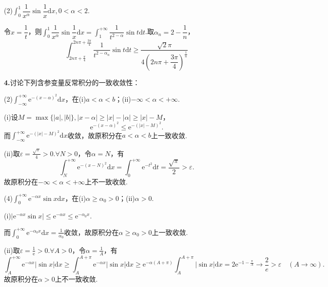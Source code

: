 \documentclass[12pt, a4paper]{article}
\newcommand{\e}{\mathrm{e}}
\newcommand{\dif}{\mathrm{d}}
\begin{document}
(2)\(\int_0^1 \dfrac{1}{x^\alpha}\sin\dfrac{1}{x}\dif x, 0 < \alpha < 2\).

令\(x = \dfrac{1}{t}\)，则\(\int_0^1 \dfrac{1}{x^\alpha}\sin\dfrac{1}{x}\dif x = \int_{1}^{+\infty} \dfrac{1}{t^{2 - \alpha}}\sin t\dif t\).取\(\alpha_n = 2 - \dfrac{1}{n}\)，
\[\int_{2n\pi + \frac{\pi}{4}}^{2n\pi + \frac{3\pi}{4}} \frac{1}{t^{2 - \alpha_n}}\sin t\dif t \geq \frac{\sqrt{2}\pi}{4\left(2n\pi + \dfrac{3\pi}{4}\right)^{\frac{1}{n}}}\]

\textbf{4.}讨论下列含参变量反常积分的一致收敛性：

(2)\(\int_{-\infty}^{+\infty} \e^{-(x - \alpha)^2}\dif x\)，在(i)\(a < \alpha < b\)；(ii)\(-\infty < \alpha < +\infty\).

(i)设\(M = \max\{|a|, |b|\}, |x - \alpha| \geq |x| - |\alpha| \geq |x| - M\)，
\[\e^{-(x - \alpha)^2} \leq \e^{-(|x| - M)^2}.\]
而\(\int_{-\infty}^{+\infty} \e^{-(|x| - M)^2}\dif x\)收敛，故原积分在\(a < \alpha < b\)上一致收敛.

(ii)取\(\varepsilon = \frac{\sqrt{\pi}}{4} > 0. \forall N > 0\)，令\(\alpha = N\)，有
\[\int_{N}^{+\infty} \e^{-(x - N)^2}\dif x = \int_{0}^{+\infty} \e^{-t^2}\dif t = \frac{\sqrt{\pi}}{2} > \varepsilon.\]
故原积分在\(-\infty < \alpha < +\infty\)上不一致收敛.

(4)\(\int_{0}^{+\infty}\e^{-\alpha x}\sin x\dif x\)，在(i)\(\alpha \geq \alpha_0 > 0\)；(ii)\(\alpha > 0\).

(i)\(|\e^{-\alpha x}\sin x| \leq \e^{-\alpha x} \leq \e^{-\alpha_0 x}\).

而\(\int_{0}^{+\infty}\e^{-\alpha_0 x}\dif x = \frac{1}{\alpha_0}\)收敛，故原积分在\(\alpha \geq \alpha_0 > 0\)上一致收敛.

(ii)取\(\varepsilon = \frac{1}{\e} > 0. \forall A > 0\)，令\(\alpha = \frac{1}{A}\)，有
\[\int_{A}^{+\infty}\e^{-\alpha x}|\sin x|\dif x \geq \int_{A}^{A + \pi}\e^{-\alpha x}|\sin x|\dif x \geq \e^{-\alpha(A + \pi)}\int_{A}^{A + \pi} |\sin x|\dif x = 2\e^{-1 - \frac{\pi}{A}} \to \frac{2}{e} > \varepsilon \quad (A \to \infty).\]
故原积分在\(\alpha > 0\)上不一致收敛.
\end{document}
